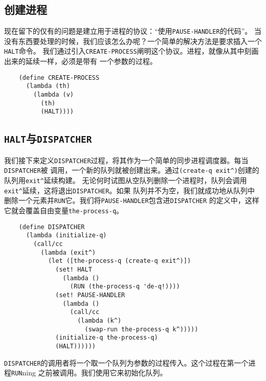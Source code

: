 \documentclass[12pt]{article}
\begin{document}
\subsection{创建进程}
现在留下的仅有的问题是建立用于进程的协议：“使用\texttt{PAUSE-HANDLER}的代码”。
当没有东西要处理的时候，我们应该怎么办呢？一个简单的解决方法是要求插入一个\texttt{HALT}命令。
我们通过引入\texttt{CREATE-PROCESS}阐明这个协议。进程，就像从其中刻画出来的延续一样，必须是带有
一个参数的过程。
\begin{verbatim}
    (define CREATE-PROCESS
      (lambda (th)
        (lambda (v)
          (th)
          (HALT))))
\end{verbatim}

\subsection{\texttt{HALT}与\texttt{DISPATCHER}}
\indent{}我们接下来定义\texttt{DISPATCHER}过程，将其作为一个简单的同步进程调度器。每当\texttt{DISPATCHER}被
调用，一个新的队列就被创建出来。通过\texttt{(create-q exit\^{})}创建的队列用\texttt{exit\^{}}延续构建。
无论何时试图从空队列删除一个进程时，队列会调用\texttt{exit\^{}}延续，这将退出\texttt{DISPATCHER}。如果
队列并不为空，我们就成功地从队列中删除一个元素并\texttt{RUN}它。我们将\texttt{PAUSE-HANDLER}包含进\texttt{DISPATCHER}
的定义中，这样它就会覆盖自由变量\texttt{the-process-q}。
\begin{verbatim}
    (define DISPATCHER
      (lambda (initialize-q)
        (call/cc
          (lambda (exit^)
            (let ([the-process-q (create-q exit^)])
              (set! HALT
                (lambda ()
                  (RUN (the-process-q 'de-q!))))
              (set! PAUSE-HANDLER
                (lambda ()
                  (call/cc
                    (lambda (k^)
                      (swap-run the-process-q k^)))))
              (initialize-q the-process-q)
              (HALT))))))
\end{verbatim}
\noindent\texttt{DISPATCHER}的调用者将一个取一个队列为参数的过程传入。这个过程在第一个进程\texttt{RUN}ning
之前被调用。我们使用它来初始化队列。
\end{document}
